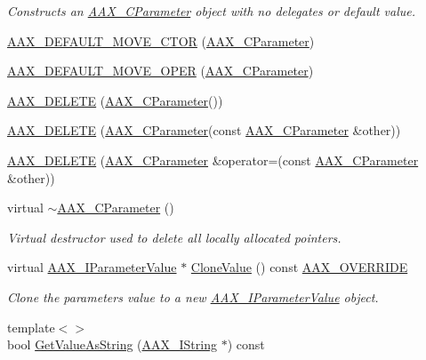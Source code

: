 \begin{DoxyCompactItemize}
\begin{DoxyCompactList}\small\item\em Constructs an \hyperlink{a00033}{A\+A\+X\+\_\+\+C\+Parameter} object with no delegates or default value. \end{DoxyCompactList}\item 
\hyperlink{a00033_a580ce7701ad95682e19e921219fb9dc7}{A\+A\+X\+\_\+\+D\+E\+F\+A\+U\+L\+T\+\_\+\+M\+O\+V\+E\+\_\+\+C\+T\+O\+R} (\hyperlink{a00033}{A\+A\+X\+\_\+\+C\+Parameter})
\item 
\hyperlink{a00033_a8bb6096dc8908ba8ec8070bc2884f98a}{A\+A\+X\+\_\+\+D\+E\+F\+A\+U\+L\+T\+\_\+\+M\+O\+V\+E\+\_\+\+O\+P\+E\+R} (\hyperlink{a00033}{A\+A\+X\+\_\+\+C\+Parameter})
\item 
\hyperlink{a00033_a1d2644a9817d469b788596529842f58d}{A\+A\+X\+\_\+\+D\+E\+L\+E\+T\+E} (\hyperlink{a00033}{A\+A\+X\+\_\+\+C\+Parameter}())
\item 
\hyperlink{a00033_a9cac0f573154fab57b963e0e6f43d96d}{A\+A\+X\+\_\+\+D\+E\+L\+E\+T\+E} (\hyperlink{a00033}{A\+A\+X\+\_\+\+C\+Parameter}(const \hyperlink{a00033}{A\+A\+X\+\_\+\+C\+Parameter} \&other))
\item 
\hyperlink{a00033_ad52217842fab274984e0e5edd8344f3a}{A\+A\+X\+\_\+\+D\+E\+L\+E\+T\+E} (\hyperlink{a00033}{A\+A\+X\+\_\+\+C\+Parameter} \&operator=(const \hyperlink{a00033}{A\+A\+X\+\_\+\+C\+Parameter} \&other))
\item 
virtual \hyperlink{a00033_acb2f8b5ecbb1f8ceeb569180b88e39e3}{$\sim$\+A\+A\+X\+\_\+\+C\+Parameter} ()
\begin{DoxyCompactList}\small\item\em Virtual destructor used to delete all locally allocated pointers. \end{DoxyCompactList}\item 
virtual \hyperlink{a00109}{A\+A\+X\+\_\+\+I\+Parameter\+Value} $\ast$ \hyperlink{a00033_a7677ba568ddf62f7393ea76c154dc397}{Clone\+Value} () const \hyperlink{a00149_ac2f24a5172689ae684344abdcce55463}{A\+A\+X\+\_\+\+O\+V\+E\+R\+R\+I\+D\+E}
\begin{DoxyCompactList}\small\item\em Clone the parameter\textquotesingle{}s value to a new \hyperlink{a00109}{A\+A\+X\+\_\+\+I\+Parameter\+Value} object. \end{DoxyCompactList}\item 
{\footnotesize template$<$$>$ }\\bool \hyperlink{a00033_af72fb87d6368888f8f97148705c0df3e}{Get\+Value\+As\+String} (\hyperlink{a00113}{A\+A\+X\+\_\+\+I\+String} $\ast$) const

\end{DoxyCompactItemize}
